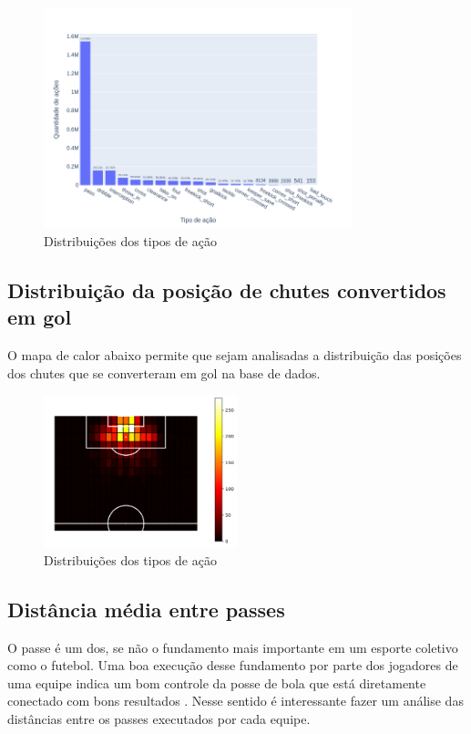 \documentclass{article}
\begin{document}
\begin{figure}[H]
	\centering
	\includegraphics[width=0.8\textwidth]{images/action_distribution.png}
	\caption{Distribuições dos tipos de ação}
	\label{fig:action_distribution}
\end{figure}

\subsection{Distribuição da posição de chutes convertidos em gol}

O mapa de calor abaixo permite que sejam analisadas a distribuição das posições
dos chutes que se converteram em gol
na base de dados.

\begin{figure}[H]
	\centering
	\includegraphics[width=0.5\textwidth]{images/goal_position_heatmap.png}
	\caption{Distribuições dos tipos de ação}
	\label{fig:heatmap_goals}
\end{figure}

\subsection{Distância média entre passes}

O passe é um dos, se não o fundamento mais importante em um esporte coletivo
como o futebol. Uma boa execução desse fundamento por parte dos jogadores
de uma equipe indica um bom controle da posse de bola que está diretamente
conectado com bons resultados \cite{cox2022linhas}. Nesse sentido é
interessante fazer um análise
das distâncias entre os passes
executados por cada equipe.
\end{document}
